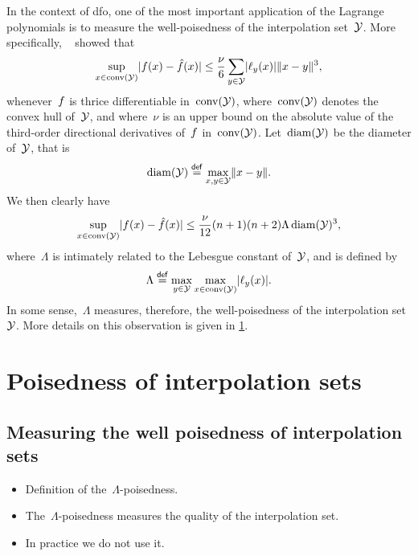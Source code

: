 In the context of \gls{dfo}, one of the most important application of the Lagrange polynomials is to measure the well-poisedness of the interpolation set~$\xpt$.
More specifically, \citeauthor{Ciarlet_Raviart_1972}~\cite{Ciarlet_Raviart_1972} showed that
\begin{equation*}
    \sup_{x \in \conv(\xpt)} \abs{\obj(x) - \objm(x)} \le \frac{\nu}{6} \sum_{y \in \xpt} \abs{\lagp[y](x)} \norm{x - y}^3,
\end{equation*}
whenever~$f$ is thrice differentiable in~$\conv(\xpt)$, where~$\conv(\xpt)$ denotes the convex hull of~$\xpt$, and where~$\nu$ is an upper bound on the absolute value of the third-order directional derivatives of~$f$ in~$\conv(\xpt)$.
Let~$\diam(\xpt)$ be the diameter of~$\xpt$, that is
\begin{equation*}
    \diam(\xpt) \eqdef \max_{x, y \in \xpt} \norm{x - y}.
\end{equation*}
We then clearly have
\begin{equation*}
    \sup_{x \in \conv(\xpt)} \abs{\obj(x) - \objm(x)} \le \frac{\nu}{12} (n + 1) (n + 2) \Lambda \diam(\xpt)^3,
\end{equation*}
where~$\Lambda$ is intimately related to the Lebesgue constant of~$\xpt$, and is defined by
\begin{equation*}
    \Lambda \eqdef \max_{y \in \xpt} \max_{x \in \conv(\xpt)} \abs{\lagp[y](x)}.
\end{equation*}
In some sense,~$\Lambda$ measures, therefore, the well-poisedness of the interpolation set~$\xpt$.
More details on this observation is given in \cref{sec:poisedness}.

\section{Poisedness of interpolation sets}
\label{sec:poisedness}

\subsection{Measuring the well poisedness of interpolation sets}

\begin{itemize}
    \item Definition of the~$\Lambda$-poisedness.
    \item The~$\Lambda$-poisedness measures the quality of the interpolation set.
    \item In practice we do not use it.
\end{itemize}

